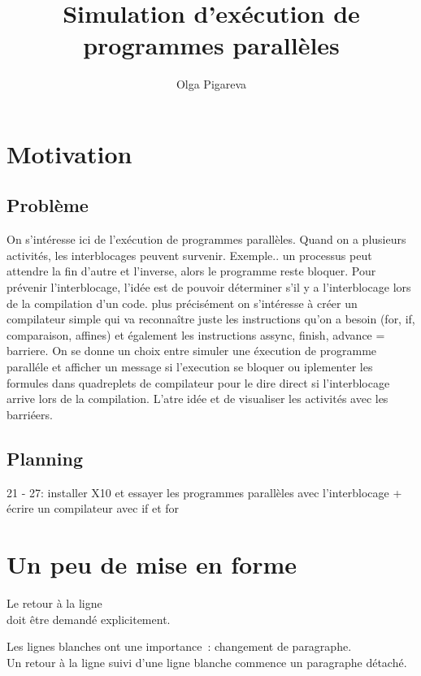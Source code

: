 \documentclass[]{article}
\title{Simulation d’exécution de programmes parallèles}
\author{Olga Pigareva} %
\begin{document}
\maketitle %

\tableofcontents %

\newpage %

\section{Motivation}
\subsection{Problème}
On s'intéresse ici de l'exécution de programmes parallèles. Quand on a plusieurs activités, les interblocages peuvent survenir.
Exemple.. un processus peut attendre la fin d'autre et l'inverse, alors le programme reste bloquer.
Pour prévenir l'interblocage, l'idée est de pouvoir déterminer s'il y a l'interblocage lors de la compilation d'un code.
plus précisément on s'intéresse à créer un compilateur simple qui va reconnaître juste les instructions qu'on a besoin (for, if, comparaison, affines)
et également les instructions assync, finish, advance = barriere. On se donne un choix entre simuler une éxecution de programme paralléle et afficher un message si l'execution se bloquer
 ou iplementer les formules dans quadreplets de compilateur pour le dire direct si l'interblocage arrive lors de la compilation.
 L'atre idée et de visualiser les activités avec les barriéers.

\subsection{Planning}
21 - 27: installer X10 et essayer les programmes parallèles avec l'interblocage
 + écrire un compilateur avec if et for 
 
\section{Un peu de mise en forme}
Le retour à la ligne\\
doit être \newline
demandé 
explicitement.

Les lignes blanches ont une importance~: changement de paragraphe. \\

Un retour à la ligne suivi d'une ligne blanche commence un paragraphe détaché.
\end{document}

